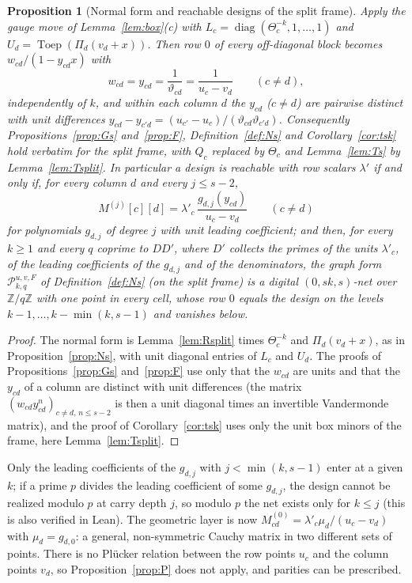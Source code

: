 \documentclass[11pt]{amsart}
\newtheorem{proposition}[theorem]{Proposition}
\theoremstyle{definition}
\theoremstyle{plain}
\newcommand{\Z}{\mathbb{Z}}
\begin{document}
\begin{proposition}[Normal form and reachable designs of the split frame]\label{prop:Gsplit}
Apply the gauge move of Lemma~\ref{lem:box}(c) with $L_c=\operatorname{diag}(\Theta_c^{-k},1,\dots,1)$ and $U_d=\operatorname{Toep}(\Pi_d(v_d+x))$. Then row $0$ of every off-diagonal block becomes $w_{cd}/(1-y_{cd}x)$ with
\[
w_{cd}=y_{cd}=\frac1{\vartheta_{cd}}=\frac1{u_c-v_d}\qquad(c\ne d),
\]
independently of $k$, and within each column $d$ the $y_{cd}$ ($c\ne d$) are pairwise distinct with unit differences $y_{cd}-y_{c'd}=(u_{c'}-u_c)/(\vartheta_{cd}\vartheta_{c'd})$. Consequently Propositions~\ref{prop:Gs} and~\ref{prop:F}, Definition~\ref{def:Ns} and Corollary~\ref{cor:tsk} hold verbatim for the split frame, with $Q_c$ replaced by $\Theta_c$ and Lemma~\ref{lem:Ts} by Lemma~\ref{lem:Tsplit}. In particular a design is reachable with row scalars $\lambda'$ if and only if, for every column $d$ and every $j\le s-2$,
\[
M^{(j)}[c][d]=\lambda'_c\,\frac{g_{d,j}(y_{cd})}{u_c-v_d}\qquad(c\ne d)
\]
for polynomials $g_{d,j}$ of degree $j$ with unit leading coefficient; and then, for every $k\ge1$ and every $q$ coprime to $DD'$, where $D'$ collects the primes of the units $\lambda'_c$, of the leading coefficients of the $g_{d,j}$ and of the denominators, the graph form $\mathcal P^{u,v,F}_{k,q}$ of Definition~\ref{def:Ns} (on the split frame) is a digital $(0,sk,s)$-net over $\Z/q\Z$ with one point in every cell, whose row $0$ equals the design on the levels $k-1,\dots,k-\min(k,s-1)$ and vanishes below.
\end{proposition}

\begin{proof}
The normal form is Lemma~\ref{lem:Rsplit} times $\Theta_c^{-k}$ and $\Pi_d(v_d+x)$, as in Proposition~\ref{prop:Ns}, with unit diagonal entries of $L_c$ and $U_d$. The proofs of Propositions~\ref{prop:Gs} and~\ref{prop:F} use only that the $w_{cd}$ are units and that the $y_{cd}$ of a column are distinct with unit differences (the matrix $(w_{cd}y_{cd}^n)_{c\ne d,\,n\le s-2}$ is then a unit diagonal times an invertible Vandermonde matrix), and the proof of Corollary~\ref{cor:tsk} uses only the unit box minors of the frame, here Lemma~\ref{lem:Tsplit}.
\end{proof}

Only the leading coefficients of the $g_{d,j}$ with $j<\min(k,s-1)$ enter at a given $k$; if a prime $p$ divides the leading coefficient of some $g_{d,j}$, the design cannot be realized modulo $p$ at carry depth $j$, so modulo $p$ the net exists only for $k\le j$ (this is also verified in Lean). The geometric layer is now $M^{(0)}_{cd}=\lambda'_c\mu_d/(u_c-v_d)$ with $\mu_d=g_{d,0}$: a general, non-symmetric Cauchy matrix in two different sets of points. There is no Pl\"ucker relation between the row points $u_c$ and the column points $v_d$, so Proposition~\ref{prop:P} does not apply, and parities can be prescribed.
\end{document}
